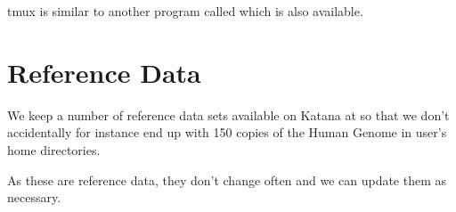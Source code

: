 \documentclass[letterpaper,10pt,english]{sphinxmanual}
\begin{document}
tmux is similar to another program called  which is also available.


\chapter{Reference Data}
\label{\detokenize{reference_data:reference-data}}\label{\detokenize{reference_data:id1}}\label{\detokenize{reference_data::doc}}
We keep a number of reference data sets available on Katana at  so that we don’t accidentally \sphinxhyphen{} for instance \sphinxhyphen{} end up with 150 copies of the Human Genome in user’s home directories.

As these are reference data, they don’t change often and we can update them as necessary.
\end{document}
